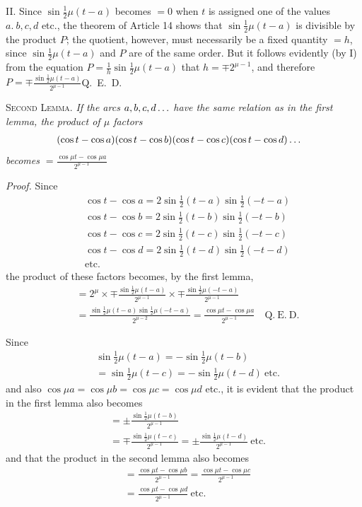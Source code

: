 II. Since \(\sin\frac12\mu(t-a)\) becomes \(=0\) when \(t\) is assigned one of the values \(a.\ b,c,d\) etc.,
the theorem of Article 14 shows that \(\sin\frac12\mu(t-a)\) is divisible by the product \(P\);
the quotient, however, must necessarily be a fixed quantity \(=h\), since \(\sin\frac12\mu(t-a)\) and \(P\)
are of the same order. But it follows evidently (by I) from the equation \(P=\frac1h\sin\frac12\mu(t-a)\)
that \(h=\mp2^{\mu-1}\), and therefore \(P=\mp\frac{\sin\frac12\mu(t-a)}{2^{\mu-1}}\)\quad Q.~E.~D.

\textsc{Second Lemma.} \emph{If the arcs \(a,b,c,d\mathinner{.\,.\,.}\) have the same relation as in the first lemma, the product of \(\mu\) factors}
\[
\begin{aligned}
&(\cos t-\cos a)(\cos t-\cos b)(\cos t-\cos c)(\cos t-\cos d)\mathinner{.\,.\,.}
\end{aligned}
\]
\noindent\emph{becomes \(=\frac{\cos\mu t-\cos\mu a}{2^{\mu-1}}\)}

\emph{Proof.} Since
\[
\begin{aligned}
&\cos t-\cos a=2\sin\frac12(t-a)\sin\frac12(-t-a)\\[5pt]
&\cos t-\cos b=2\sin\frac12(t-b)\sin\frac12(-t-b)\\[5pt]
&\cos t-\cos c=2\sin\frac12(t-c)\sin\frac12(-t-c)\\[5pt]
&\cos t-\cos d=2\sin\frac12(t-d)\sin\frac12(-t-d)\\[5pt]
&\mathrm{etc.}
\end{aligned}
\]
\noindent the product of these factors becomes, by the first lemma,
\[
\begin{aligned}
&=2^{\mu}\times\mp\frac{\sin\frac12\mu(t-a)}{2^{\mu-1}}\times\mp\frac{\sin\frac12\mu(-t-a)}{2^{\mu-1}}\\[5pt]
&=\frac{\sin\frac12\mu(t-a)\sin\frac12\mu(-t-a)}{2^{\mu-2}}=\frac{\cos\mu t-\cos\mu a}{2^{\mu-1}}\quad\mathrm{Q.\ E.\ D.}
\end{aligned}
\]

Since
\[
\begin{aligned}
&\sin\frac12\mu(t-a)=-\sin\frac12\mu(t-b)\\[5pt]&=\sin\frac12\mu(t-c)=-\sin\frac12\mu(t-d)\ \mathrm{etc.}
\end{aligned}
\]
\noindent and also \(\cos\mu a=\cos\mu b=\cos\mu c=\cos\mu d\) etc., it is evident that the product
in the first lemma also becomes
\[
\begin{aligned}
&=\pm\frac{\sin\frac12\mu(t-b)}{2^{\mu-1}}\\[5pt]&=\mp\frac{\sin\frac12\mu(t-c)}{2^{\mu-1}}=\pm\frac{\sin\frac12\mu(t-d)}{2^{\mu-1}}\ \mathrm{etc.}
\end{aligned}
\]
\noindent and that the product in the second lemma also becomes
\[
\begin{aligned}
&=\frac{\cos\mu t-\cos\mu b}{2^{\mu-1}}=\frac{\cos\mu t-\cos\mu c}{2^{\mu-1}}\\[5pt]&=\frac{\cos\mu t-\cos\mu d}{2^{\mu-1}}\ \mathrm{etc.}
\end{aligned}
\]

\endgroup
